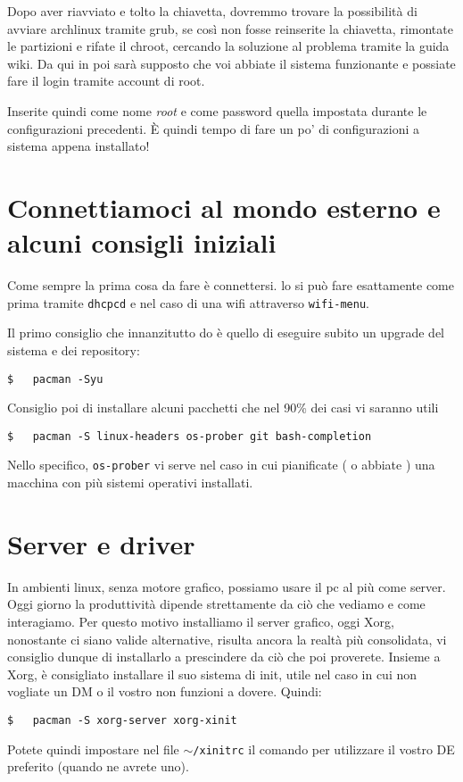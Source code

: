 \documentclass[twoside,italian]{book}
\newcommand{\code}[1]{\texttt{#1}}
\begin{document}
Dopo aver riavviato e tolto la chiavetta, dovremmo trovare la possibilità di avviare archlinux tramite grub, se così non fosse reinserite la chiavetta, rimontate le partizioni e rifate il chroot, cercando la soluzione al problema tramite la guida wiki.
Da qui in poi sarà supposto che voi abbiate il sistema funzionante e possiate fare il login tramite account di root.

Inserite quindi come nome \textit{root} e come password quella impostata durante le configurazioni precedenti. È quindi tempo di fare un po' di configurazioni a sistema appena installato!

\section{Connettiamoci al mondo esterno e alcuni consigli iniziali}

    Come sempre la prima cosa da fare è connettersi. lo si può fare esattamente come prima tramite \code{dhcpcd} e nel caso di una wifi attraverso \code{wifi-menu}.

    Il primo consiglio che innanzitutto do è quello di eseguire subito un upgrade del sistema e dei repository:
    \begin{lstlisting}
$   pacman -Syu
    \end{lstlisting}
    Consiglio poi di installare alcuni pacchetti che nel 90\% dei casi vi saranno utili
    \begin{lstlisting}
$   pacman -S linux-headers os-prober git bash-completion
    \end{lstlisting}
    Nello specifico, \code{os-prober} vi serve nel caso in cui pianificate ( o abbiate ) una macchina con più sistemi operativi installati.

\section{Server e driver}

    In ambienti linux, senza motore grafico, possiamo usare il pc al più come server. Oggi giorno la produttività dipende strettamente da ciò che vediamo e come interagiamo. Per questo motivo installiamo il server grafico, oggi Xorg, nonostante ci siano valide alternative, risulta ancora la realtà più consolidata, vi consiglio dunque di installarlo a prescindere da ciò che poi proverete. Insieme a Xorg, è consigliato installare il suo sistema di init, utile nel caso in cui non vogliate un DM o il vostro non funzioni a dovere. Quindi:
    \begin{lstlisting}
$   pacman -S xorg-server xorg-xinit
    \end{lstlisting}
    Potete quindi impostare nel file \code{$\sim$/xinitrc} il comando per utilizzare  il vostro DE preferito (quando ne avrete uno).
\end{document}
